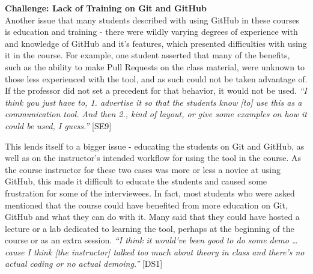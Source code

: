 
\textbf{Challenge: Lack of Training on Git and GitHub} \\
Another issue that many students described with using GitHub in these courses is education and training - there were wildly varying degrees of experience with and knowledge of GitHub and it's features, which presented difficulties with using it in the course. For example, one student asserted that many of the benefits, such as the ability to make Pull Requests on the class material, were unknown to those less experienced with the tool, and as such could not be taken advantage of. If the professor did not set a precedent for that behavior, it would not be used. \textit{``I think you just have to, 1. advertise it so that the students know [to] use this as a communication tool. And then 2., kind of layout, or give some examples on how it could be used, I guess.''} [SE9]

This lends itself to a bigger issue - educating the students on Git and GitHub, as well as on the instructor's intended workflow for using the tool in the course. As the course instructor for these two cases was more or less a novice at using GitHub, this made it difficult to educate the students and caused some frustration for some of the interviewees. In fact, most students who were asked mentioned that the course could have benefited from more education on Git, GitHub and what they can do with it. Many said that they could have hosted a lecture or a lab dedicated to learning the tool, perhaps at the beginning of the course or as an extra session. \textit{``I think it would've been good to do some demo \ldots cause I think [the instructor] talked too much about theory in class and there's no actual coding or no actual demoing.''} [DS1]


